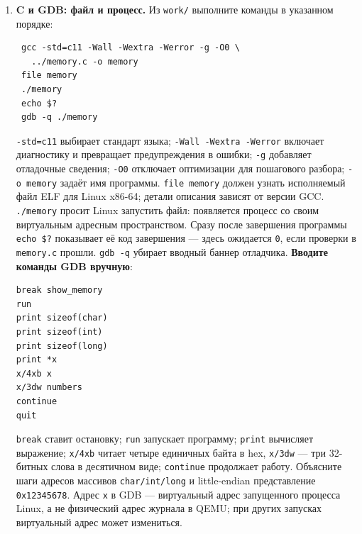 \begin{enumerate}
\def\labelenumi{\arabic{enumi}.}
\item
  \textbf{C и GDB: файл и процесс.} Из \texttt{work/} выполните команды
  в указанном порядке:

\begin{verbatim}
 gcc -std=c11 -Wall -Wextra -Werror -g -O0 \
   ../memory.c -o memory
 file memory
 ./memory
 echo $?
 gdb -q ./memory
\end{verbatim}

  \texttt{-std=c11} выбирает стандарт языка;
  \texttt{-Wall\ -Wextra\ -Werror} включает диагностику и превращает
  предупреждения в ошибки; \texttt{-g} добавляет отладочные сведения;
  \texttt{-O0} отключает оптимизации для пошагового разбора;
  \texttt{-o\ memory} задаёт имя программы. \texttt{file\ memory} должен
  узнать исполняемый файл ELF для Linux x86-64; детали описания зависят
  от версии GCC. \texttt{./memory} просит Linux запустить файл:
  появляется процесс со своим виртуальным адресным пространством. Сразу
  после завершения программы \texttt{echo\ \$?} показывает её код
  завершения --- здесь ожидается \texttt{0}, если проверки в
  \texttt{memory.c} прошли. \texttt{gdb\ -q} убирает вводный баннер
  отладчика. \textbf{Вводите команды GDB вручную}:

\begin{verbatim}
break show_memory
run
print sizeof(char)
print sizeof(int)
print sizeof(long)
print *x
x/4xb x
x/3dw numbers
continue
quit
\end{verbatim}

  \texttt{break} ставит остановку; \texttt{run} запускает программу;
  \texttt{print} вычисляет выражение; \texttt{x/4xb} читает четыре
  единичных байта в hex, \texttt{x/3dw} --- три 32-битных слова в
  десятичном виде; \texttt{continue} продолжает работу. Объясните шаги
  адресов массивов \texttt{char/int/long} и little-endian представление
  \texttt{0x12345678}. Адрес \texttt{x} в GDB --- виртуальный адрес
  запущенного процесса Linux, а не физический адрес журнала в QEMU; при
  других запусках виртуальный адрес может измениться.


\end{enumerate}
